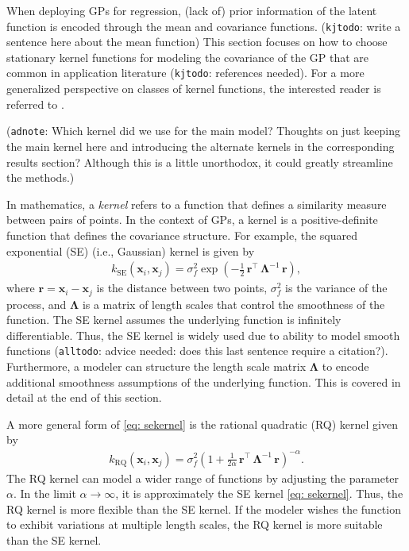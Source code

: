 \documentclass[journal=jacsat,manuscript=article]{achemso}
\newcommand{\kjtodo}[1]{{\color{Red} (\texttt{kjtodo}: #1)}}
\newcommand{\alltodo}[1]{{\color{Cyan} (\texttt{alltodo}: #1)}}
\newcommand{\xvec}{\ensuremath{\mathbf{x}}}
\newcommand{\adnote}[1]{{\color{OliveGreen} (\texttt{adnote}: #1)}}
\begin{document}
When deploying GPs for regression, (lack of) prior information of the latent function is encoded through the mean and covariance functions. \kjtodo{write a sentence here about the mean function} This section focuses on how to choose stationary kernel functions for modeling the covariance of the GP that are common in application literature \kjtodo{references needed}. For a more generalized perspective on classes of kernel functions, the interested reader is referred to \citeauthor{Genton} \cite{Genton}.

\adnote{Which kernel did we use for the main model? Thoughts on just keeping the main kernel here and introducing the alternate kernels in the corresponding results section? Although this is a little unorthodox, it could greatly streamline the methods.}

In mathematics, a \textit{kernel} refers to a function that defines a similarity measure between pairs of points. In the context of GPs, a kernel is a positive-definite function that defines the covariance structure. For example, the squared exponential (SE) (i.e., Gaussian) kernel is given by
\begin{gather}
     k_{\text{SE}}(\xvec_i,\xvec_j) = \sigma_f^2 \exp \left(-\frac{1}{2}\, \mathbf{r}^\intercal \,\boldsymbol{\Lambda}^{-1} \,\mathbf{r} \right), \label{eq: sekernel}
 \end{gather}
 where $\mathbf{r} = \xvec_i - \xvec_j$ is the distance between two points, $\sigma_f^2$ is the variance of the process, and $\boldsymbol{\Lambda}$ is a matrix of length scales that control the smoothness of the function. The SE kernel assumes the underlying function is infinitely differentiable. Thus, the SE kernel is widely used due to ability to model smooth functions \alltodo{advice needed: does this last sentence require a citation?}. Furthermore, a modeler can structure the length scale matrix $\boldsymbol{\Lambda}$ to encode additional smoothness assumptions of the underlying function. This is covered in detail at the end of this section. 

 A more general form of \eqref{eq: sekernel} is the rational quadratic (RQ) kernel given by
 \begin{gather}
     k_{\text{RQ}}(\xvec_i,\xvec_j) = \sigma_f^2 \left(1 +\frac{1}{2 \alpha} \,\mathbf{r}^\intercal \,\boldsymbol{\Lambda}^{-1} \,\mathbf{r} \right)^{-\alpha}. \label{eq: rationalquadkernel}
 \end{gather}
 The RQ kernel can model a wider range of functions by adjusting the parameter $\alpha$. In the limit $\alpha \rightarrow \infty$, it is approximately the SE kernel \eqref{eq: sekernel}. Thus, the RQ kernel is more flexible than the SE kernel. If the modeler wishes the function to exhibit variations at multiple length scales, the RQ kernel is more suitable than the SE kernel.
\end{document}

